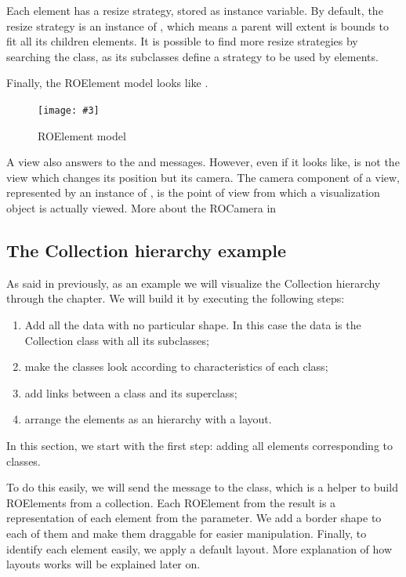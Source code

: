 \documentclass[a4paper,10pt,twoside]{book}
\newcommand{\fig}[4]{
		\begin{figure}[#1]
			\centering
			\texttt{[image: \#3]}
			\caption{\label{fig:#3}#4}
		\end{figure}}
\begin{document}
Each element has a resize strategy, stored as  instance variable.
By default, the resize strategy is an instance of , which means a parent will extent is bounds to fit all its children elements.
It is possible to find more resize strategies by searching the  class, as its subclasses define a strategy to be used by elements.

Finally, the ROElement model looks like .

\fig{H}{0.5}{ROElementModel}{ROElement model}

A view also answers to the  and  messages. However, even if it looks like, is not the view which changes its position but its camera. The camera component of a view, represented by an instance of , is the point of view from which a visualization object is actually viewed. More about the ROCamera in 

\subsection*{The Collection hierarchy example}

As said in previously, as an example we will visualize the Collection hierarchy through the chapter. We will build it by executing the following steps:
\begin{enumerate}
\item Add all the data with no particular shape. In this case the data is the Collection class with all its subclasses;
\item make the classes look according to characteristics of each class;
\item add links between a class and its superclass;
\item arrange the elements as an hierarchy with a layout.
\end{enumerate}

In this section, we start with the first step: adding all elements corresponding to classes. 

To do this easily, we will send the  message to the  class, which is a helper to build ROElements from a collection. 
Each ROElement from the result is a representation of each element from the parameter. We add a border shape to each of them and make them draggable for easier manipulation.
Finally, to identify each element easily, we apply a default layout. More explanation of how layouts works will be explained later on. 
\end{document}
